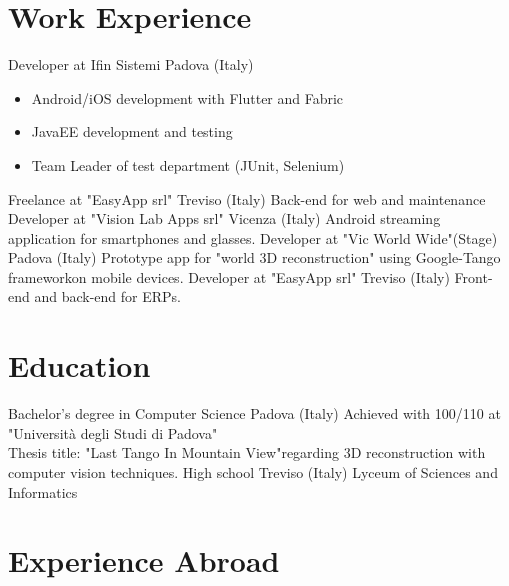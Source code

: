 \documentclass[letterpaper]{twentysecondcv} %
\begin{document}
\section{Work Experience}

\begin{twenty} %
		{Developer at Ifin Sistemi\footnotemarkA[1]} {Padova (Italy)}
		{\begin{itemize}[noitemsep,nolistsep]
				\item Android/iOS development with Flutter and Fabric
				\item JavaEE development and testing
				\item Team Leader of test department (JUnit, Selenium)
			\end{itemize}
		}
		{Freelance at "EasyApp srl"\footnotemarkA[2]} {Treviso (Italy)}
		{Back-end for web and maintenance}
		{Developer at "Vision Lab Apps srl"\footnotemarkA[3]}	{Vicenza (Italy)}
		{Android streaming application for smartphones and glasses.}
		{Developer at "Vic World Wide"\footnotemarkA[4] (Stage)}	{Padova (Italy)}
		{Prototype app for "world 3D reconstruction" using Google-Tango framework\footnotemarkA[5] on mobile devices.}
		{Developer at "EasyApp srl"\footnotemarkA[2]}	{Treviso (Italy)}
		{Front-end and back-end for ERPs.}
\end{twenty}

\section{Education}

\begin{twenty} %
		{Bachelor's degree in Computer Science}	{Padova (Italy)}
		{Achieved with 100/110 at "Università degli Studi di Padova"\footnotemarkA[6]\\
		Thesis title: "Last Tango In Mountain View"\footnotemarkA[7] regarding 3D reconstruction with computer vision techniques.}
		{High school}	{Treviso (Italy)}
		{Lyceum of Sciences and Informatics}
\end{twenty}

\section{Experience Abroad}  
\end{document}
